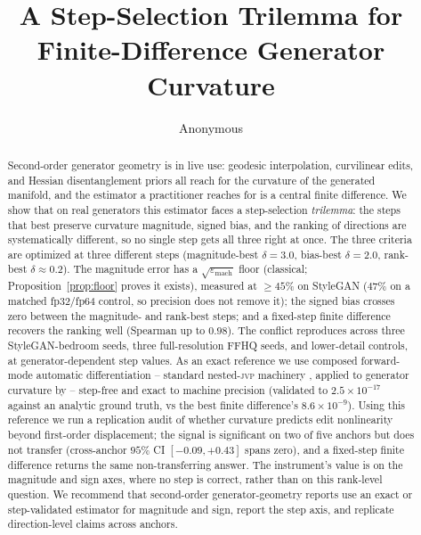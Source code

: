\documentclass[10pt]{article}
\title{A Step-Selection Trilemma for Finite-Difference Generator Curvature}
\author{\name Anonymous}
\newcommand{\jvp}{\textsc{jvp}}
\newcommand{\eps}{\varepsilon}
\begin{document}
\maketitle

\begin{abstract}
Second-order generator geometry is in live use: geodesic interpolation, curvilinear
edits, and Hessian disentanglement priors all reach for the curvature of the generated
manifold, and the estimator a practitioner reaches for is a central finite difference. We
show that on real generators this estimator faces a step-selection \emph{trilemma}: the steps
that best preserve curvature magnitude, signed bias, and the ranking of directions are
systematically different, so no single step gets all three right at once. The three criteria are
optimized at three different steps (magnitude-best $\delta=3.0$, bias-best $\delta=2.0$,
rank-best $\delta\approx0.2$). The magnitude error has a $\sqrt{\eps_{\mathrm{mach}}}$ floor
(classical; Proposition~\ref{prop:floor} proves it exists), measured at $\geq45\%$ on StyleGAN
($47\%$ on a matched fp32/fp64 control, so precision does not remove it); the signed bias crosses
zero between the magnitude- and rank-best steps; and a fixed-step finite difference recovers the
ranking well (Spearman up to $0.98$).
The conflict reproduces across three StyleGAN-bedroom seeds, three full-resolution FFHQ seeds,
and lower-detail controls, at generator-dependent step values. As an exact reference we use
composed forward-mode automatic differentiation -- standard nested-\jvp{} machinery
\citep{pearlmutter1994,fike2011,baydin2018,cobb2024}, applied to generator curvature by
\citet{lee2023} -- step-free and exact to machine precision (validated to $2.5\times10^{-17}$
against an analytic ground truth, vs the best finite difference's $8.6\times10^{-9}$). Using this reference we run a replication audit of whether curvature predicts edit nonlinearity
beyond first-order displacement; the signal is significant on two of five anchors but does not
transfer (cross-anchor $95\%$ CI $[-0.09,+0.43]$ spans zero), and a fixed-step finite difference
returns the same non-transferring answer. The instrument's value is on the magnitude and sign
axes, where no step is correct, rather than on this rank-level question. We
recommend that second-order generator-geometry reports use an exact or step-validated
estimator for magnitude and sign, report the step axis, and replicate direction-level claims
across anchors.
\end{abstract}
\end{document}
